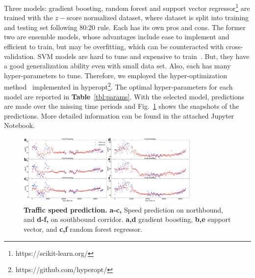 \documentclass[5pt]{article}
\numberwithin{table}{section}
\begin{document}
Three models: gradient boosting, random forest and support vector regressor\footnote{https://scikit-learn.org/} are trained with the $z-$score normalized dataset, where dataset is split into training and testing set following 80:20 rule. Each has its own pros and cons. The former two are ensemble models, whose advantages include ease to implement and efficient to train, but may be overfitting, which can be counteracted with cross-validation. SVM models are hard to tune and expensive to train~\cite{bishop2006pattern,friedman2001elements}. But, they have a good generalization ability even with small data set. Also, each has many hyper-parameters to tune. Therefore, we employed the hyper-optimization method~\cite{snoek2012practical} implemented in hyperopt\footnote{https://github.com/hyperopt/}. The optimal hyper-parameters for each model are reported in \textbf{Table}~\ref{tbl:params}. With the selected model, predictions are made over the missing time periods and Fig.~\ref{fig:preds} shows the snapshots of the predictions. More detailed information can be found in the attached Jupyter Notebook.

\begin{figure}[!h]
\centering
\includegraphics[width=0.8\textwidth]{figs/predictions}
\caption{\textbf{Traffic speed prediction.} \textbf{a-c,} Speed prediction on northbound, and \textbf{d-f,} on southbound corridor. \textbf{a,d} gradient boosting, \textbf{b,e} support vector, and \textbf{c,f} random forest regressor.} 
\label{fig:preds}
\end{figure}

\end{document}
